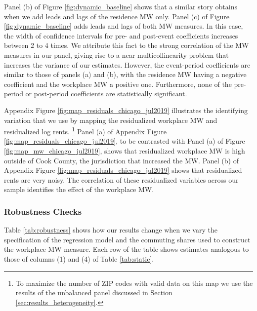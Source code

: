 Panel (b) of Figure \ref{fig:dynamic_baseline} shows that a similar story 
obtains when we add leads and lags of the residence MW only.
Panel (c) of Figure \ref{fig:dynamic_baseline} adds leads and lags of both MW 
measures.
In this case, the width of confidence intervals for pre- and post-event 
coefficients increases between 2 to 4 times.
We attribute this fact to the strong correlation of the MW measures in our
panel, giving rise to a near multicollinearity problem that increases the 
variance of our estimates.
However, the event-period coefficients are similar to those of 
panels (a) and (b), with the residence MW having a negative coefficient and the
workplace MW a positive one.
Furthermore, none of the pre-period or post-period coefficients are statistically
significant.

Appendix Figure \ref{fig:map_residuals_chicago_jul2019} illustrates the 
identifying variation that we use by mapping the residualized workplace MW and 
residualized log rents.%
\footnote{To maximize the number of ZIP codes with valid data on this map we
use the results of the unbalanced panel discussed in Section 
\ref{sec:results_heterogeneity}.}
Panel (a) of Appendix Figure \ref{fig:map_residuals_chicago_jul2019}, to be 
contrasted with Panel (a) of Figure \ref{fig:map_mw_chicago_jul2019}, 
shows that residualized workplace MW is high outside of Cook County, the 
jurisdiction that increased the MW.
Panel (b) of Appendix Figure \ref{fig:map_residuals_chicago_jul2019} shows 
that residualized rents are very noisy.
The correlation of these residualized variables across our sample identifies
the effect of the workplace MW.

\subsubsection*{Robustness Checks}

Table \ref{tab:robustness} shows how our results change when we vary the
specification of the regression model and the commuting shares used 
to construct the workplace MW measure.
Each row of the table shows estimates analogous to those of columns (1) and (4)
of Table \ref{tab:static}.

